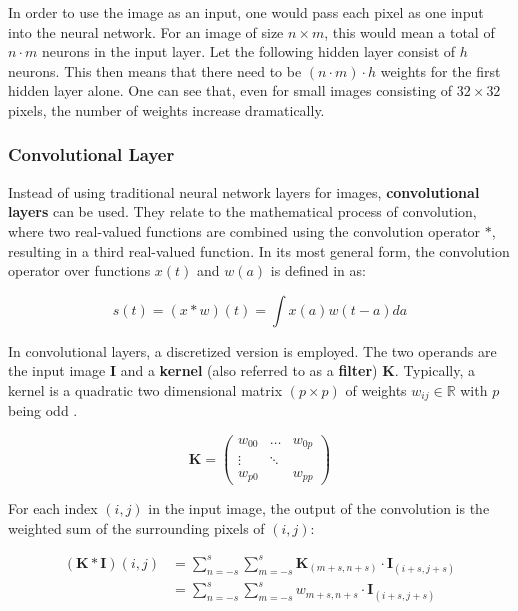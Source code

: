 In order to use the image as an input, one would pass each pixel as one input into the neural network.
For an image of size $n \times m$, this would mean a total of $n \cdot m$ neurons in the input layer.
Let the following hidden layer consist of $h$ neurons.
This then means that there need to be $(n \cdot m) \cdot h$ weights for the first hidden layer alone.
One can see that, even for small images consisting of $32 \times 32$ pixels, the number of weights increase dramatically.

\subsubsection{Convolutional Layer}

Instead of using traditional neural network layers for images, \textbf{convolutional layers} can be used.
They relate to the mathematical process of convolution, where two real-valued functions are combined using the convolution operator $*$, resulting in a third real-valued function.
In its most general form, the convolution operator over functions $x(t)$ and $w(a)$ is defined in \cite{goodfellow_deep_2016} as:

\begin{equation}
    s(t) = (x * w)(t) = \int x(a)w(t-a)da
\end{equation}

In convolutional layers, a discretized version is employed.
The two operands are the input image $\bm{I}$ and a \textbf{kernel} (also referred to as a \textbf{filter}) $\bm{K}$.
Typically, a kernel is a quadratic two dimensional matrix $(p \times p)$ of weights $w_{ij} \in \mathbb{R}$ with $p$ being odd .

\begin{equation}
    \label{eq:kernel_definition}
    \bm{K} =
    \begin{pmatrix}
        w_{00} & \dots  & w_{0p} \\
        \vdots & \ddots & \\
        w_{p0} &        & w_{pp}
    \end{pmatrix}
\end{equation}

For each index $(i,j)$ in the input image, the output of the convolution is the weighted sum of the surrounding pixels of $(i,j)$:

\begin{equation}
    \begin{split}
        (\bm{K} * \bm{I})(i,j)
        &= \sum_{n=-s}^s \sum_{m=-s}^s \bm{K}_{(m+s, n+s)} \cdot \bm{I}_{(i+s, j+s)} \\
        &= \sum_{n=-s}^s \sum_{m=-s}^s w_{m+s, n+s} \cdot \bm{I}_{(i+s, j+s)}
    \end{split}
\end{equation}

